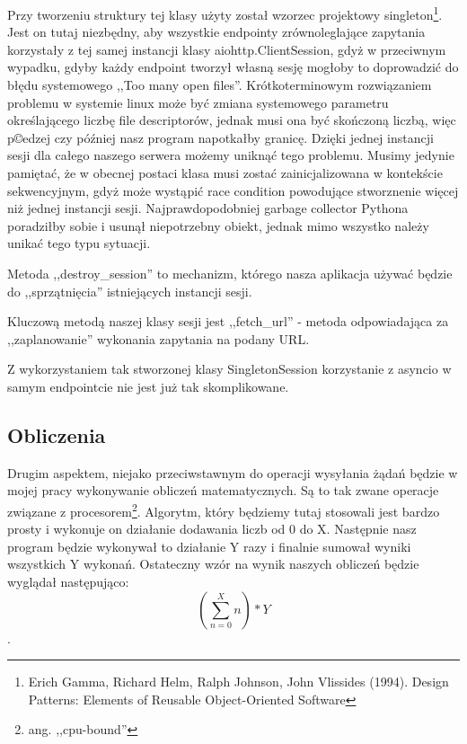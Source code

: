 Przy tworzeniu struktury tej klasy użyty został wzorzec projektowy singleton\footnote{Erich Gamma, Richard Helm, Ralph Johnson, John Vlissides (1994). Design Patterns: Elements of Reusable Object-Oriented Software}. Jest on tutaj niezbędny, aby wszystkie endpointy zrównoleglające zapytania korzystały z tej samej instancji klasy aiohttp.ClientSession, gdyż w przeciwnym wypadku, gdyby każdy endpoint tworzył własną sesję mogłoby to doprowadzić do błędu systemowego ,,Too many open files''. Krótkoterminowym rozwiązaniem problemu w systemie linux może być zmiana systemowego parametru określającego liczbę file descriptorów, jednak musi ona być skończoną liczbą, więc p©edzej czy później nasz program napotkałby granicę. Dzięki jednej instancji sesji dla całego naszego serwera możemy uniknąć tego problemu. Musimy jedynie pamiętać, że w obecnej postaci klasa musi zostać zainicjalizowana w kontekście sekwencyjnym, gdyż może wystąpić race condition powodujące stworznenie więcej niż jednej instancji sesji. Najprawdopodobniej garbage collector Pythona poradziłby sobie i usunął niepotrzebny obiekt, jednak mimo wszystko należy unikać tego typu sytuacji.

Metoda ,,destroy\_session'' to mechanizm, którego nasza aplikacja używać będzie do ,,sprzątnięcia'' istniejących instancji sesji.

Kluczową metodą naszej klasy sesji jest ,,fetch\_url'' - metoda odpowiadająca za ,,zaplanowanie'' wykonania zapytania na podany URL.

Z wykorzystaniem tak stworzonej klasy SingletonSession korzystanie z asyncio w samym endpointcie nie jest już tak skomplikowane.

\subsection{Obliczenia}
Drugim aspektem, niejako przeciwstawnym do operacji wysyłania żądań będzie w mojej pracy wykonywanie obliczeń matematycznych. Są to tak zwane operacje związane z procesorem\footnote{ang. ,,cpu-bound''}. Algorytm, który będziemy tutaj stosowali jest bardzo prosty i wykonuje on działanie dodawania liczb od 0 do X. Następnie nasz program będzie wykonywał to działanie Y razy i finalnie sumował wyniki wszystkich Y wykonań. Ostateczny wzór na wynik naszych obliczeń będzie wyglądał następująco:
\[ (\sum_{n=0}^{X} n) * Y \].

